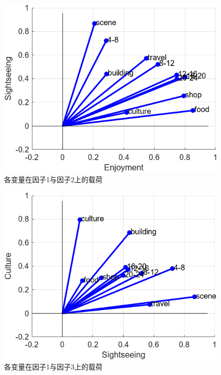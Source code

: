 \documentclass[UTF8]{ctexart}
\begin{document}
		\begin{figure}[H]
			\centering
			\includegraphics{fac3_s&e.png}
			\caption{各变量在因子1与因子2上的载荷}
			\label{fac_se}
		\end{figure}
		\begin{figure}[H]
			\centering
			\includegraphics{fac3_s&c.png}
			\caption{各变量在因子1与因子3上的载荷}
			\label{fac_sc}
		\end{figure}
\end{document}
